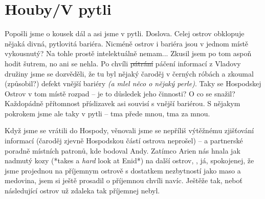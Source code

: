 \documentclass[a4paper,twocolumn,openany,nodeprecatedcode, justified]{dndbook}
\begin{document}
	\section[Sezení 3]{Houby/V pytli}
	Popošli jsme o kousek dál a asi jsme v pytli. Doslova. Celej ostrov obklopuje nějaká divná, pytlovitá bariéra. Nicméně ostrov i bariéra jsou v jednom místě vykousnutý? Na tohle prostě intelektuálně nemam... Zkusil jsem po tom aspoň hodit šutrem, no ani se nehla. Po chvíli \sout{pátrání} páčení informací z Vladovy družiny jsme se dozvěděli, že tu byl nějaký čaroděj v černých róbách a zkoumal (způsobil?) defekt vnější bariéry \emph{(a mlel něco o nějaký perle)}. Taky se Hospodskej Ostrov v tom místě rozpad -- je to důsledek jeho činnosti? O co se snažil? Každopádně přítomnost příslizavek asi souvisí s vnější bariérou. S nějakym pokrokem jsme ale taky v pytli -- tma přede mnou, tma za mnou.
	
	Když jsme se vrátili do Hospody, věnovali jsme se nepříliš výtěžnému zjišťování informací (čaroděj zjevně Hospodskou částí ostrova neprošel) -- a partnerské poradně místních patronů, kde \emph{} bodoval Andy. Zatímco Arien nás hnala jak nadmutý kozy (*takes a \emph{hard} look at Enid*) na další ostrov, , já, spokojenej, že jsme projednou na příjemnym ostrově s dostatkem nezbytností jako maso a medovina, jsem si ještě prosadil o příjemnou chvíli navíc. Ještěže tak, neboť následující ostrov už zdaleka tak příjemnej nebyl.
	
\end{document}
